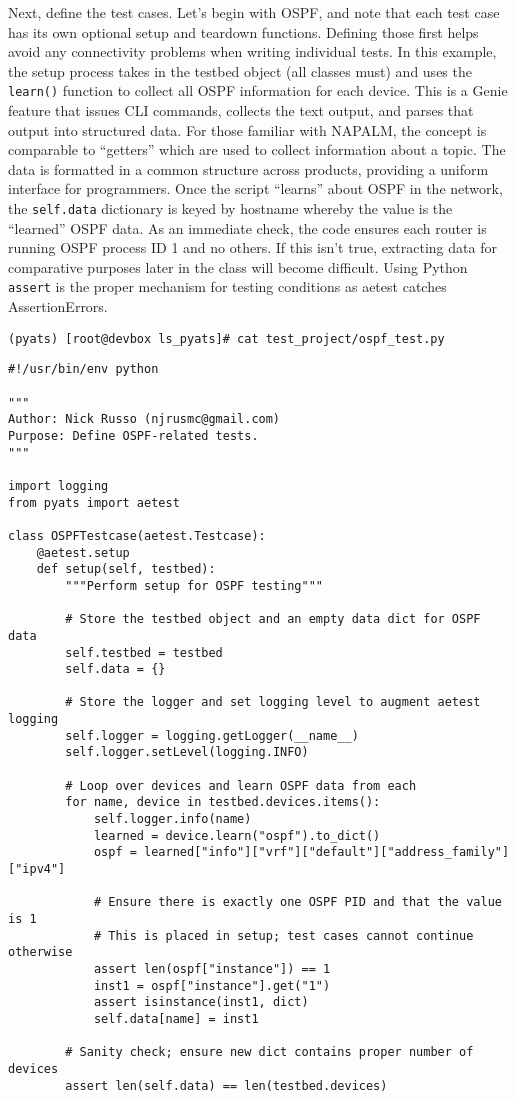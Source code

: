 Next, define the test cases. Let's begin with OSPF, and note that each test
case has its own optional setup and teardown functions. Defining those first
helps avoid any connectivity problems when writing individual tests. In this
example, the setup process takes in the testbed object (all classes must) and
uses the \verb|learn()| function to collect all OSPF information for each
device. This is a Genie feature that issues CLI commands, collects the text
output, and parses that output into structured data. For those familiar with
NAPALM, the concept is comparable to ``getters'' which are used to collect
information about a topic. The data is formatted in a common structure
across products, providing a uniform interface for programmers.
Once the script ``learns'' about OSPF in the network, the \verb|self.data|
dictionary is keyed by hostname whereby the value is the ``learned'' OSPF data.
As an immediate check, the code ensures each router is running OSPF process ID
1 and no others. If this isn't true, extracting data for comparative purposes
later in the class will become difficult. Using Python \verb|assert| is the
proper mechanism for testing conditions as aetest catches AssertionErrors.


\begin{verbatim}
(pyats) [root@devbox ls_pyats]# cat test_project/ospf_test.py
\end{verbatim}

\begin{verbatim}
#!/usr/bin/env python

"""
Author: Nick Russo (njrusmc@gmail.com)
Purpose: Define OSPF-related tests.
"""

import logging
from pyats import aetest

class OSPFTestcase(aetest.Testcase):
    @aetest.setup
    def setup(self, testbed):
        """Perform setup for OSPF testing"""

        # Store the testbed object and an empty data dict for OSPF data
        self.testbed = testbed
        self.data = {}

        # Store the logger and set logging level to augment aetest logging
        self.logger = logging.getLogger(__name__)
        self.logger.setLevel(logging.INFO)

        # Loop over devices and learn OSPF data from each
        for name, device in testbed.devices.items():
            self.logger.info(name)
            learned = device.learn("ospf").to_dict()
            ospf = learned["info"]["vrf"]["default"]["address_family"]["ipv4"]

            # Ensure there is exactly one OSPF PID and that the value is 1
            # This is placed in setup; test cases cannot continue otherwise
            assert len(ospf["instance"]) == 1
            inst1 = ospf["instance"].get("1")
            assert isinstance(inst1, dict)
            self.data[name] = inst1

        # Sanity check; ensure new dict contains proper number of devices
        assert len(self.data) == len(testbed.devices)
\end{verbatim}

